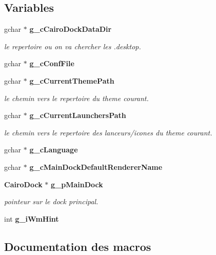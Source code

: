 \subsection*{Variables}
\begin{CompactItemize}
\item 
gchar $\ast$ {\bf g\_\-c\-Cairo\-Dock\-Data\-Dir}
\begin{CompactList}\small\item\em le repertoire ou on va chercher les .desktop. \item\end{CompactList}\item 
gchar $\ast$ {\bf g\_\-c\-Conf\-File}
\item 
gchar $\ast$ {\bf g\_\-c\-Current\-Theme\-Path}
\begin{CompactList}\small\item\em le chemin vers le repertoire du theme courant. \item\end{CompactList}\item 
gchar $\ast$ {\bf g\_\-c\-Current\-Launchers\-Path}
\begin{CompactList}\small\item\em le chemin vers le repertoire des lanceurs/icones du theme courant. \item\end{CompactList}\item 
gchar $\ast$ {\bf g\_\-c\-Language}
\item 
gchar $\ast$ {\bf g\_\-c\-Main\-Dock\-Default\-Renderer\-Name}
\item 
{\bf Cairo\-Dock} $\ast$ {\bf g\_\-p\-Main\-Dock}
\begin{CompactList}\small\item\em pointeur sur le dock principal. \item\end{CompactList}\item 
int {\bf g\_\-i\-Wm\-Hint}
\end{CompactItemize}


\subsection{Documentation des macros}
